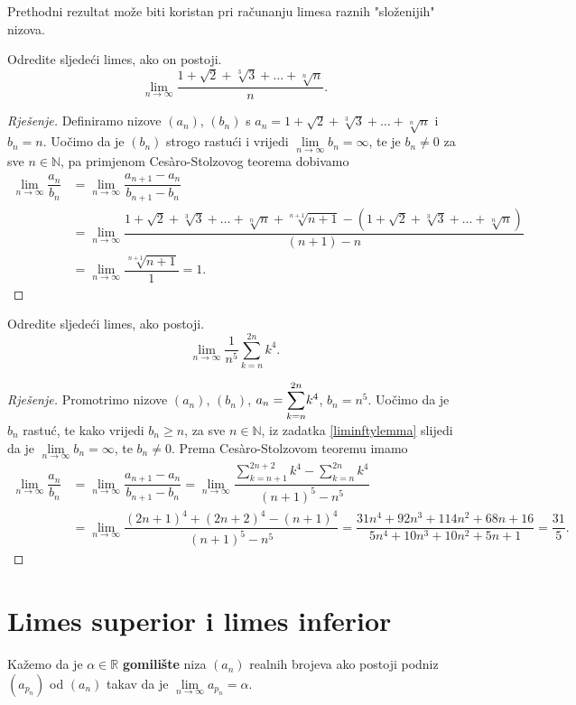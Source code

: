 Prethodni rezultat može biti koristan pri računanju limesa raznih "složenijih" nizova.
\begin{exercise}
Odredite sljedeći limes, ako on postoji. 
$$\lim\limits_{n\to \infty}{\dfrac{1+\sqrt{2}+\sqrt[3]{3}+\dots+\sqrt[n]{n}}{n}}.$$
\end{exercise}
\begin{proof}[Rješenje]
Definiramo nizove $(a_n)$, $(b_n)$ s $a_n=1+\sqrt{2}+\sqrt[3]{3}+\dots+\sqrt[n]{n}$ i $b_n=n$. Uočimo da je $(b_n)$ strogo rastući i vrijedi $\lim\limits_{n\to \infty}{b_n}=\infty$, te je $b_n\neq 0$ za sve $n\in \mathbb{N}$, pa primjenom Cesàro-Stolzovog teorema dobivamo
\begin{align*}
\lim\limits_{n\to \infty}{\dfrac{a_n}{b_n}}&=\lim\limits_{n\to \infty}{\dfrac{a_{n+1}-a_n}{b_{n+1}-b_n}}\\
&=\lim\limits_{n\to \infty}{\dfrac{1+\sqrt{2}+\sqrt[3]{3}+\dots+\sqrt[n]{n}+\sqrt[n+1]{n+1}-(1+\sqrt{2}+\sqrt[3]{3}+\dots+\sqrt[n]{n})}{(n+1)-n}}\\
&=\lim\limits_{n\to \infty}{\dfrac{\sqrt[n+1]{n+1}}{1}}=1.
\end{align*}
\end{proof}
\begin{exercise}
Odredite sljedeći limes, ako postoji.
$$\lim\limits_{n\to \infty}{\dfrac{1}{n^5}\sum_{k=n}^{2n}{k^4}}.$$
\end{exercise}
\begin{proof}[Rješenje]
Promotrimo nizove $(a_n)$, $(b_n)$, $a_n=\dsum_{k=n}^{2n}{k^4}$, $b_n=n^5$. Uočimo da je $b_n$ rastuć, te kako vrijedi $b_n\geq n$, za sve $n\in \mathbb{N}$, iz zadatka \ref{liminftylemma} slijedi da je $\lim\limits_{n\to \infty}{b_n}=\infty$, te $b_n\neq 0$. Prema Cesàro-Stolzovom teoremu imamo
\begin{align*}
\lim\limits_{n\to \infty}{\dfrac{a_n}{b_n}}&=\lim\limits_{n\to\infty}{\dfrac{a_{n+1}-a_n}{b_{n+1}-b_n}}
=\lim\limits_{n\to \infty}{\dfrac{\sum_{k=n+1}^{2n+2}{k^4}-\sum_{k=n}^{2n}{k^4}}{(n+1)^5-n^5}}\\
&=\lim\limits_{n\to \infty}{\dfrac{(2n+1)^4+(2n+2)^4-(n+1)^4}{(n+1)^5-n^5}}=\dfrac{31n^4+92n^3+114n^2+68n+16}{5n^4+10n^3+10n^2+5n+1}=\dfrac{31}{5}.
\end{align*}
\end{proof}
\section{Limes superior i limes inferior}
\begin{definition}
Kažemo da je $\alpha\in \mathbb{R}$ \textbf{gomilište} niza $(a_n)$ realnih brojeva ako postoji podniz $(a_{p_n})$ od $(a_n)$ takav da je $\lim\limits_{n\to \infty}{a_{p_n}}=\alpha$.
\end{definition}

